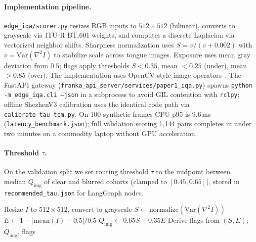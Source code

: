 \paragraph{Implementation pipeline.}
\texttt{edge\_iqa/scorer.py} resizes RGB inputs to $512\times512$ (bilinear), converts to grayscale via ITU-R BT.601 weights, and computes a discrete Laplacian via vectorized neighbor shifts.
Sharpness normalization uses $S = v/(v+0.002)$ with $v=\mathrm{Var}(\nabla^2 I)$ to stabilize scale across tongue images.
Exposure uses mean gray deviation from $0.5$; flags apply thresholds $S<0.35$, mean $<0.25$ (under), mean $>0.85$ (over).
The implementation uses OpenCV-style image operators~\cite{opencv2020}. The FastAPI gateway (\texttt{franka\_api\_server/services/paper1\_iqa.py}) spawns \texttt{python -m edge\_iqa.cli --json} in a subprocess to avoid GIL contention with \texttt{rclpy}; offline ShezhenV3 calibration uses the identical code path via \texttt{calibrate\_tau\_tcm.py}.
On 100 synthetic frames CPU p95 is 9.6\,ms (\texttt{latency\_benchmark.json}); full validation scoring 1{,}144 pairs completes in under two minutes on a commodity laptop without GPU acceleration.

\paragraph{Threshold $\tau$.}
On the validation split we set routing threshold $\tau$ to the midpoint between median $Q_{\mathrm{img}}$ of clear and blurred cohorts (clamped to $[0.45,0.65]$), stored in \texttt{recommended\_tau.json} for LangGraph nodes.

\begin{algorithm}[t]
\caption{Edge-IQA scoring}
\begin{algorithmic}[1]
\STATE Resize $I$ to $512\times512$, convert to grayscale
\STATE $S \leftarrow \mathrm{normalize}(\mathrm{Var}(\nabla^2 I))$
\STATE $E \leftarrow 1 - | \mathrm{mean}(I) - 0.5 | / 0.5$
\STATE $Q_{\mathrm{img}} \leftarrow 0.65 S + 0.35 E$
\STATE Derive flags from $(S,E)$; \RETURN $Q_{\mathrm{img}}$, flags
\end{algorithmic}
\end{algorithm}
